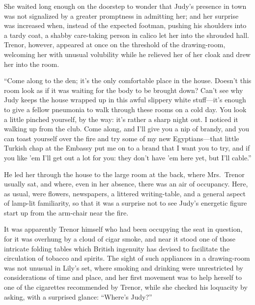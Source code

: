 \documentclass[12pt,a4paper]{book}
\begin{document}
She waited long enough on the doorstep to wonder that
Judy's presence in town was not signalized by a greater
promptness in admitting her; and her surprise was increased when,
instead of the expected footman, pushing his shoulders into a
tardy coat, a shabby care-taking person in calico let her into
the shrouded hall. Trenor, however, appeared at once on the
threshold of the drawing-room, welcoming her with unusual
volubility while he relieved her of her cloak and drew her into
the room.





``Come along to the den; it's the only comfortable place in the
house. Doesn't this room look as if it was waiting for the body
to be brought down? Can't see why Judy keeps the house wrapped up
in this awful slippery white stuff---it's enough to give a fellow
pneumonia to walk through these rooms on a cold day. You look a
little pinched yourself, by the way: it's rather a sharp night
out. I noticed it walking up from the club. Come along, and I'll
give you a nip of brandy, and you can toast yourself over the
fire and try some of my new Egyptians---that little Turkish chap
at the Embassy put me on to a brand that I want you to try, and
if you like 'em I'll get out a lot for you: they don't have 'em
here yet, but I'll cable.''





He led her through the house to the large room at the back, where
Mrs.\ Trenor usually sat, and where, even in her absence, there
was an air of occupancy. Here, as usual, were flowers,
newspapers, a littered writing-table, and a general aspect of
lamp-lit familiarity, so that it was a surprise not to see Judy's
energetic figure start up from the arm-chair near the fire.





It was apparently Trenor himself who had been occupying the seat
in question, for it was overhung by a cloud of cigar smoke, and
near it stood one of those intricate folding tables which British
ingenuity has devised to facilitate the circulation of tobacco
and spirits. The sight of such appliances in a drawing-room was
not unusual in Lily's set, where smoking and drinking were
unrestricted by considerations of time and place, and her first
movement was to help herself to one of the cigarettes recommended
by Trenor, while she checked his loquacity by asking, with a
surprised glance: ``Where's Judy?''
\end{document}
